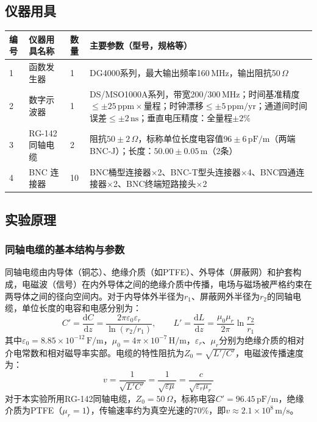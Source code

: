 \documentclass[dvipsnames, svgnames,a4paper,11pt]{article}
\begin{document}
\subsection{仪器用具}
\begin{table}[htbp]
	\centering
	\renewcommand\arraystretch{1.6}
	\begin{tabular}{p{}|p{}|p{}|p{}}
	\hline
	编号 & 仪器用具名称 & 数量 & 主要参数（型号，规格等） \\
	\hline
	1 & 函数发生器 & 1 & DG4000系列，最大输出频率160\,MHz，输出阻抗50\,$\Omega$ \\
	2 & 数字示波器 & 1 & DS/MSO1000A系列，带宽200/300\,MHz；时间基准精度$\leq\pm25\,\mathrm{ppm}\times$量程；时钟漂移$\leq\pm5\,\mathrm{ppm/yr}$；通道间时间误差$\leq\pm2\,\mathrm{ns}$；垂直电压精度：全量程$\pm2\%$ \\
	3 & RG-142 同轴电缆 & 2 & 阻抗$50\pm2\,\Omega$，标称单位长度电容值$96\pm6\,\mathrm{pF/m}$（两端BNC-J）；长度：$50.00\pm0.05\,\mathrm{m}$（2条）\\
	4 & BNC 连接器 & 10 & BNC桶型连接器$\times$2、BNC-T型头连接器$\times$4、BNC四通连接器$\times$2、BNC终端短路接头$\times$2 \\
	\hline

	\end{tabular}
\end{table}

\subsection{实验原理}

\subsubsection{同轴电缆的基本结构与参数}

同轴电缆由内导体（铜芯）、绝缘介质（如PTFE）、外导体（屏蔽网）和护套构成，电磁波（信号）在内外导体之间的绝缘介质中传播，电场与磁场被严格约束在两导体之间的径向空间内。对于内导体外半径为$r_1$、屏蔽网外半径为$r_2$的同轴电缆，单位长度的电容和电感分别为：
\begin{equation}
	C' = \frac{\mathrm{d}C}{\mathrm{d}z} = \frac{2\pi\varepsilon_0\varepsilon_r}{\ln(r_2/r_1)}, \qquad
	L' = \frac{\mathrm{d}L}{\mathrm{d}z} = \frac{\mu_0\mu_r}{2\pi}\ln\frac{r_2}{r_1}
\end{equation}
其中$\varepsilon_0=8.85\times10^{-12}\,\mathrm{F/m}$，$\mu_0=4\pi\times10^{-7}\,\mathrm{H/m}$，$\varepsilon_r$、$\mu_r$分别为绝缘介质的相对介电常数和相对磁导率实部。电缆的特性阻抗为$Z_0=\sqrt{L'/C'}$，电磁波传播速度为：
\begin{equation}
	v = \frac{1}{\sqrt{L'C'}} = \frac{1}{\sqrt{\varepsilon\mu}} = \frac{c}{\sqrt{\varepsilon_r\mu_r}}
	\label{eq:v}
\end{equation}
对于本实验所用RG-142同轴电缆，$Z_0=50\,\Omega$，标称电容$C'=96.45\,\mathrm{pF/m}$，绝缘介质为PTFE（$\mu_r=1$），传输速率约为真空光速的70\%，即$v\approx2.1\times10^8\,\mathrm{m/s}$。
\end{document}
